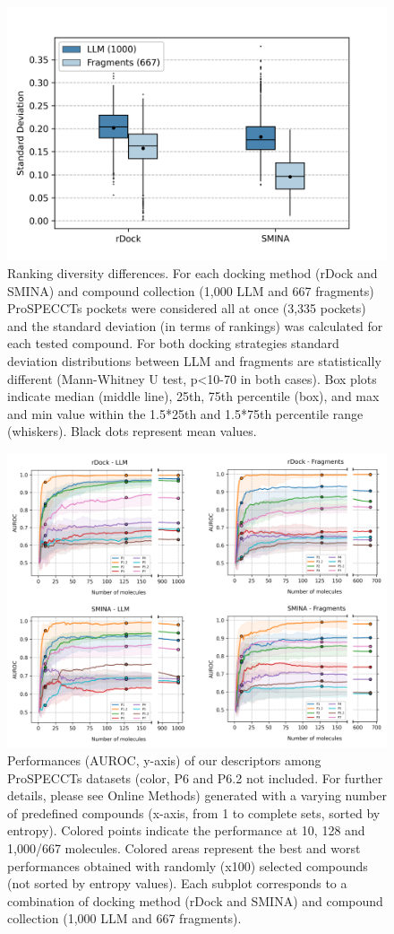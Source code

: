 \begin{figure}[htbp]
  \centering
  \includegraphics[width=0.55\linewidth]{figures/PocketVec/Supplementary/FigS6.png}
  \caption{
  Ranking diversity differences. For each docking method (rDock and SMINA) and compound collection (1,000 LLM and 667 fragments) ProSPECCTs pockets were considered all at once (3,335 pockets) and the standard deviation (in terms of rankings) was calculated for each tested compound. For both docking strategies standard deviation distributions between LLM and fragments are statistically different (Mann-Whitney U test, p<10-70 in both cases). Box plots indicate median (middle line), 25th, 75th percentile (box), and max and min value within the 1.5*25th and 1.5*75th percentile range (whiskers). Black dots represent mean values.
  }
  \label{FigS6}
\end{figure}


\begin{figure}[htbp]
  \centering
  \includegraphics[width=1\linewidth]{figures/PocketVec/Supplementary/FigS7.png}
  \caption{
  Performances (AUROC, y-axis) of our descriptors among ProSPECCTs datasets (color, P6 and P6.2 not included. For further details, please see Online Methods) generated with a varying number of predefined compounds (x-axis, from 1 to complete sets, sorted by entropy). Colored points indicate the performance at 10, 128 and 1,000/667 molecules. Colored areas represent the best and worst performances obtained with randomly (x100) selected compounds (not sorted by entropy values). Each subplot corresponds to a combination of docking method (rDock and SMINA) and compound collection (1,000 LLM and 667 fragments).   
  }
  \label{FigS7}
\end{figure}

